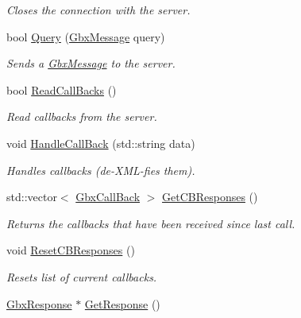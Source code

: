 \begin{DoxyCompactItemize}
\begin{DoxyCompactList}\small\item\em Closes the connection with the server. \end{DoxyCompactList}\item 
bool \hyperlink{classGbxRemote_a8ecc0e0625a8dca310cebd78bd2b3c7e}{Query} (\hyperlink{classGbxMessage}{Gbx\-Message} query)
\begin{DoxyCompactList}\small\item\em Sends a \hyperlink{classGbxMessage}{Gbx\-Message} to the server. \end{DoxyCompactList}\item 
bool \hyperlink{classGbxRemote_ac595861af2f4d7349ce3841f0758507d}{Read\-Call\-Backs} ()
\begin{DoxyCompactList}\small\item\em Read callbacks from the server. \end{DoxyCompactList}\item 
void \hyperlink{classGbxRemote_a5bd6e1dc2118f7e369e72592b3c9322a}{Handle\-Call\-Back} (std\-::string data)
\begin{DoxyCompactList}\small\item\em Handles callbacks (de-\/\-X\-M\-L-\/fies them). \end{DoxyCompactList}\item 
\hypertarget{classGbxRemote_a1ae6ff7eddcccdeda59af2316d053aae}{std\-::vector$<$ \hyperlink{classGbxCallBack}{Gbx\-Call\-Back} $>$ \hyperlink{classGbxRemote_a1ae6ff7eddcccdeda59af2316d053aae}{Get\-C\-B\-Responses} ()}\label{classGbxRemote_a1ae6ff7eddcccdeda59af2316d053aae}

\begin{DoxyCompactList}\small\item\em Returns the callbacks that have been received since last call. \end{DoxyCompactList}\item 
\hypertarget{classGbxRemote_a81ba62f042948610a3cf720316e22076}{void \hyperlink{classGbxRemote_a81ba62f042948610a3cf720316e22076}{Reset\-C\-B\-Responses} ()}\label{classGbxRemote_a81ba62f042948610a3cf720316e22076}

\begin{DoxyCompactList}\small\item\em Resets list of current callbacks. \end{DoxyCompactList}\item 
\hypertarget{classGbxRemote_adac67444e391ffcc1dfda8f087eaef0b}{\hyperlink{classGbxResponse}{Gbx\-Response} $\ast$ \hyperlink{classGbxRemote_adac67444e391ffcc1dfda8f087eaef0b}{Get\-Response} ()}\label{classGbxRemote_adac67444e391ffcc1dfda8f087eaef0b}


\end{DoxyCompactItemize}
